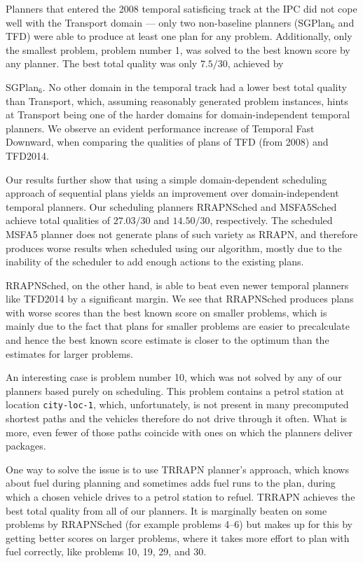 Planners that entered the 2008 temporal satisficing track at the IPC did not cope well with the Transport domain
--- only two non-baseline planners (SGPlan$_6$ and TFD) were able to produce at least one plan
for any problem. Additionally, only the smallest problem, problem number 1, was solved
to the best known score by any planner.
The best total quality was only $7.5/30$, achieved by
{SGPlan$_6$. No other domain in the temporal track had a lower best total quality
than Transport, which, assuming reasonably generated problem instances, hints
at Transport being one of the harder domains for domain-independent temporal planners.
We observe an evident performance increase of Temporal Fast Downward,
when comparing the qualities of plans of TFD (from 2008) and TFD2014.

Our results further show that using a simple domain-dependent scheduling approach
of sequential plans yields an improvement over domain-independent temporal planners. Our scheduling planners RRAPNSched
and MSFA5Sched achieve total qualities of $27.03/30$
and $14.50/30$, respectively.
The scheduled MSFA5 planner does not generate plans of such variety as RRAPN,
and therefore produces worse results when scheduled using our algorithm,
mostly due to the inability of the scheduler to add enough 
actions to the existing plans.

RRAPNSched, on the other hand, is able to beat even newer temporal planners like TFD2014
by a significant margin.
We see that RRAPNSched produces plans with worse scores than the best known score on smaller problems, which is mainly due to the fact that plans for smaller problems are easier to precalculate and hence the best known score estimate is closer
to the optimum than the estimates for larger problems.

An interesting case is problem number 10,
which was not solved by any of our planners based purely on scheduling.
This problem contains a petrol station at location \texttt{city-loc-1},
which, unfortunately, is not present in many precomputed shortest
paths and the vehicles therefore do not drive through it often.
What is more, even fewer of those paths coincide with ones
on which the planners deliver packages.

One way to solve the issue is to use TRRAPN planner's approach,
which knows about fuel during planning and 
sometimes adds fuel runs to the plan, during which a chosen vehicle
drives to a petrol station to refuel.
TRRAPN achieves the best total quality from all of our planners.
It is marginally beaten on some problems by RRAPNSched (for example problems 4--6) but makes up for this by getting better scores on
larger problems, where it takes more effort to plan with fuel correctly,
like problems 10, 19, 29, and 30.

}
